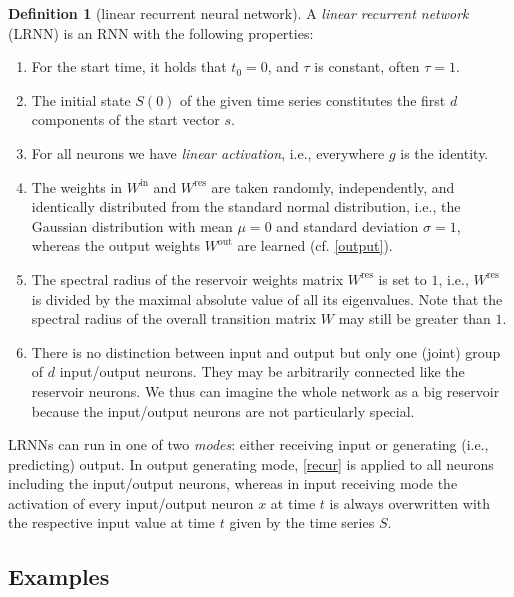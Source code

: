 \documentclass[twoside,11pt]{article}
\theoremstyle{definition}
\newtheorem{defn}{Definition}
\begin{document}
\begin{defn}[linear recurrent neural network]\label{thedef}
A \emph{linear recurrent network} (LRNN) is an RNN with the
following properties:
\begin{enumerate}
  \item For the start time, it holds that $t_0=0$, and $\tau$ is constant, often $\tau=1$.
  \item The initial state $S(0)$ of the given time series constitutes the first
	$d$ components of the start vector $s$.
  \item For all neurons we have \emph{linear activation}, i.e., everywhere $g$
	is the identity.
  \item The weights in $W^\mathrm{in}$ and $W^\mathrm{res}$ are taken
	randomly, independently, and identically distributed from the standard
	normal distribution, i.e., the Gaussian distribution with mean $\mu = 0$
	and standard deviation $\sigma = 1$, whereas the output weights
	$W^\mathrm{out}$ are learned (cf. \cref{output}).
  \item The spectral radius of the reservoir weights matrix $W^\mathrm{res}$ is
	set to $1$, i.e., $W^\mathrm{res}$ is divided by the maximal absolute
	value of all its eigenvalues. Note that the spectral radius of the
	overall transition matrix $W$ may still be greater than $1$.
  \item There is no distinction between input and output but only one (joint)
	group of $d$ input/output neurons. They may be arbitrarily connected
	like the reservoir neurons. We thus can imagine the whole network as a
	big reservoir because the input/output neurons are not particularly
	special.
\end{enumerate}
\end{defn}

LRNNs can run in one of two \emph{modes}: either receiving input or generating
(i.e., predicting) output. In output generating mode, \cref{recur} is applied to
all neurons including the input/output neurons, whereas in input receiving mode
the activation of every input/output neuron $x$ at time $t$ is always
overwritten with the respective input value at time $t$ given by the time series
$S$.

\subsection{Examples}
\end{document}
